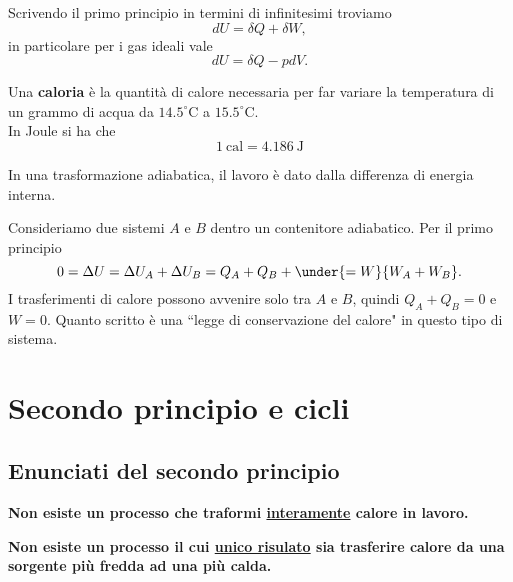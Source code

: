 \begin{remark}
Scrivendo il primo principio in termini di infinitesimi troviamo
\[dU=\delta Q+\delta W,\]
in particolare per i gas ideali vale
\[dU=\delta Q-pdV.\]
\end{remark}


\begin{definition}[Caloria]
Una \textbf{caloria} \`e la quantit\`a di calore necessaria per far variare la temperatura di un grammo di acqua da $14.5^\circ\mathrm{C}$ a $15.5^\circ\mathrm{C}$.\\
In Joule si ha che
\[\boxed{1\ \mathrm{cal}=4.186\ \mathrm{J}}\]
\end{definition}


\begin{remark}
In una trasformazione adiabatica, il lavoro \`e dato dalla differenza di energia interna.
\end{remark}
\begin{example}
Consideriamo due sistemi $A$ e $B$ dentro un contenitore adiabatico. Per il primo principio
\[0=\Delta U=\Delta U_A+\Delta U_B=Q_A+Q_B+\under{=W}{W_A+W_B}.\]
I trasferimenti di calore possono avvenire solo tra $A$ e $B$, quindi $Q_A+Q_B=0$ e $W=0$. Quanto scritto \`e una ``legge di conservazione del calore" in questo tipo di sistema.
\end{example}

\section{Secondo principio e cicli}
\subsection{Enunciati del secondo principio}
\begin{fact}
\textbf{Non esiste un processo che traformi \ul{interamente} calore in lavoro.}
\end{fact}

\begin{fact}
\textbf{Non esiste un processo il cui \ul{unico risulato} sia trasferire calore da una sorgente pi\`u fredda ad una pi\`u calda.}
\end{fact}

